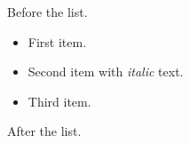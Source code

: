 Before the list.

\begin{itemize}
\item First item.
\item Second item with \emph{italic} text.
\item Third item.
\end{itemize}

After the list.
